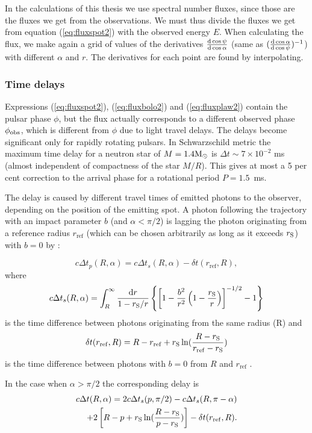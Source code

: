 \documentclass{wihuri}
\def\rg{r_{\rm S}} %
\def\be{\begin{equation}}
\def\ee{\end{equation}}
\def\msun{{\rm M_{\odot}}}
\def\d{{\rm d}}
\def\rg{r_{\rm S}} %
\def\phiobs{\phi_{\rm obs}}
\begin{document}
In the calculations of this thesis we use spectral number fluxes, since those are the fluxes we get from the observations. We must thus divide the fluxes we get from equation (\ref{eq:fluxspot2}) with the observed energy $E$. When calculating the flux, we make again a grid of values of the derivatives $\frac{\d\cos\psi}{\d\cos\alpha}$ (same as $(\frac{\d\cos\alpha}{\d\cos\psi})^{-1}$) with different $\alpha$ and $r$. The derivatives for each point are found by interpolating. 


\subsubsection{Time delays}



Expressions (\ref{eq:fluxspot2}), (\ref{eq:fluxbolo2}) and (\ref{eq:fluxplaw2}) 
contain the pulsar phase $\phi$, but the flux actually corresponds to a different 
observed phase $\phiobs$, which is different from $\phi$ due to light travel delays.  
The delays become significant only for rapidly rotating pulsars.
In Schwarzschild metric the maximum time delay for a neutron star
of $M=1.4\msun$ is $\Delta t\sim 7\times 10^{-2}$ ms (almost independent
of compactness of the star $M/R$). This gives at most 
a 5 per cent correction to the arrival phase for a rotational period $P=1.5$~ms.

   
The delay is caused by different travel times of emitted
photons to the observer, depending on the position of the emitting spot.
A photon following the trajectory with an impact parameter $b$ (and $\alpha < \pi/2$)
is lagging the photon originating from a reference radius $r_{\mathrm{ref}}$ (which can be chosen arbitrarily as long as it exceeds $\rg$) with $b=0$ by \cite{pechenick}%
:

\be \label{eq:delay2}
c\Delta t_{p}(R,\alpha)=  c\Delta t_{s}(R,\alpha) -\delta t(r_{\mathrm{ref}},R),
\ee
where 
\be \label{eq:delayint}
c\Delta t_{s}(R,\alpha) =
\int_R^{\infty} \frac{\d r}{1- \rg/r}
\left\{ \left[ 1-  \frac{b^2}{r^2}  \left( 1- \frac{\rg}{r} \right)
\right] ^{-1/2}  -1 \right\}
\ee
is the time difference between photons originating from the same radius (R) and
\be
\delta t(r_{\mathrm{ref}},R) = R-r_{\mathrm{ref}}+\rg\ln(\frac{R-\rg}{r_{\mathrm{ref}}-\rg})
\ee
is the time difference between photons with $b=0$ from $R$ and $r_{\mathrm{ref}}$ \cite{falkner}. 

In the case when $\alpha > \pi/2$ the corresponding delay is
\be\label{eq:delay22}
\begin{split}
c\Delta t(R,\alpha)= 2c\Delta t_{s}(p,\pi/2)-c\Delta t_{s}(R,\pi-\alpha)\\+2\left[ R-p+\rg\ln(\frac{R-\rg}{p-\rg})\right]-\delta t(r_{\mathrm{ref}},R).
\end{split}
\ee
\end{document}
